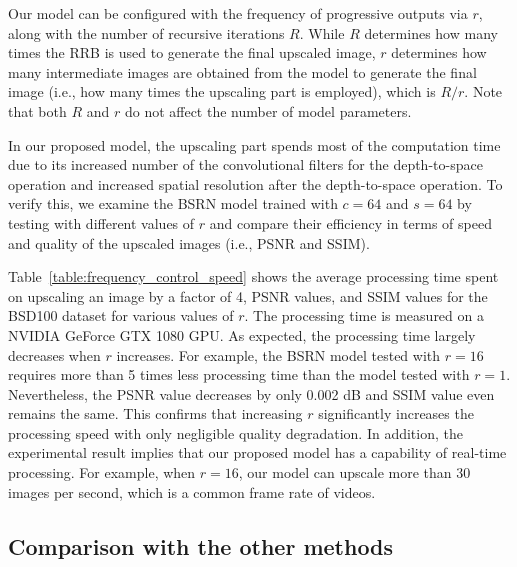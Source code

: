 \documentclass[runningheads]{llncs}
\begin{document}
Our model can be configured with the frequency of progressive outputs via $r$, along with the number of recursive iterations $R$.
While $R$ determines how many times the RRB is used to generate the final upscaled image, $r$ determines how many intermediate images are obtained from the model to generate the final image (i.e., how many times the upscaling part is employed), which is $R/r$.
Note that both $R$ and $r$ do not affect the number of model parameters.

In our proposed model, the upscaling part spends most of the computation time due to its increased number of the convolutional filters for the depth-to-space operation and increased spatial resolution after the depth-to-space operation.
To verify this, we examine the BSRN model trained with $c=64$ and $s=64$ by testing with different values of $r$ and compare their efficiency in terms of speed and quality of the upscaled images (i.e., PSNR and SSIM).

Table~\ref{table:frequency_control_speed} shows the average processing time spent on upscaling an image by a factor of 4, PSNR values, and SSIM values for the BSD100 dataset \cite{martin2001database} for various values of $r$.
The processing time is measured on a NVIDIA GeForce GTX 1080 GPU.
As expected, the processing time largely decreases when $r$ increases.
For example, the BSRN model tested with $r=16$ requires more than 5 times less processing time than the model tested with $r=1$.
Nevertheless, the PSNR value decreases by only 0.002 dB and SSIM value even remains the same.
This confirms that increasing $r$ significantly increases the processing speed with only negligible quality degradation.
In addition, the experimental result implies that our proposed model has a capability of real-time processing.
For example, when $r=16$, our model can upscale more than 30 images per second, which is a common frame rate of videos.


\subsection{Comparison with the other methods}
\label{sec:compare_sota}
\end{document}
